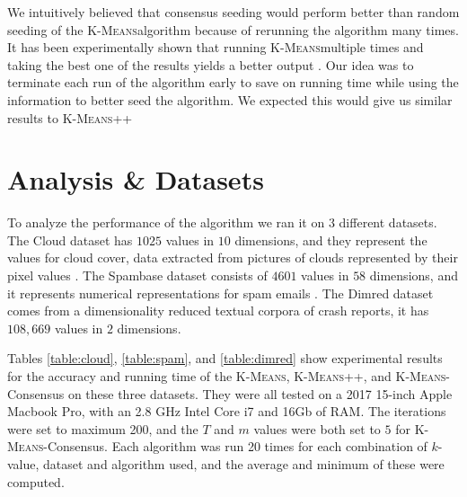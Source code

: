 \documentclass[12pt]{dalthesis}
\newcommand*{\kmeansn}{\textsc{K-Means}} %
\newcommand*{\kmeans}{\kmeansn } %
\begin{document}
We intuitively believed that consensus seeding would perform better than random seeding of the \kmeans algorithm because of rerunning the algorithm many times. It has been experimentally shown that running \kmeans multiple times and taking the best one of the results yields a better output \citep{arthur2007k}. Our idea was to terminate each run of the algorithm early to save on running time while using the information to better seed the algorithm. We expected this would give us similar results to \kmeansn++

\section{Analysis \& Datasets}

To analyze the performance of the algorithm we ran it on 3 different datasets. The Cloud dataset has $1025$ values in $10$ dimensions, and they represent the values for cloud cover, data extracted from pictures of clouds represented by their pixel values \citep{cloud}. The Spambase dataset consists of $4601$ values in $58$ dimensions, and it represents numerical representations for spam emails \citep{spam}. The Dimred dataset comes from a dimensionality reduced textual corpora of crash reports, it has $108,669$ values in $2$ dimensions.

Tables \ref{table:cloud}, \ref{table:spam}, and \ref{table:dimred} show experimental results for the accuracy and running time of the \kmeans, \kmeansn++, and \kmeansn-Consensus on these three datasets. They were all tested on a 2017 15-inch Apple Macbook Pro, with an 2.8 GHz Intel Core i7 and 16Gb of RAM. The iterations were set to maximum 200, and the $T$ and $m$ values were both set to $5$ for \kmeansn-Consensus. Each algorithm was run 20 times for each combination of $k$-value, dataset and algorithm used, and the average and minimum of these were computed.
\end{document}
